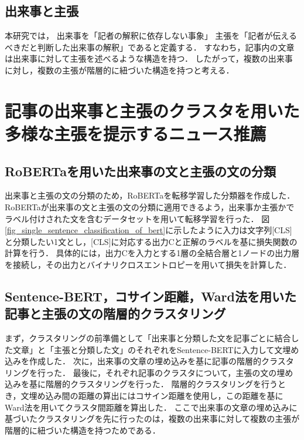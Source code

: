 \documentclass[12pt,a4j,dvipdfmx]{jreport}
\begin{document}
\subsection{出来事と主張}
本研究では，
出来事を「記者の解釈に依存しない事象」
主張を「記者が伝えるべきだと判断した出来事の解釈」であると定義する．
すなわち，記事内の文章は出来事に対して主張を述べるような構造を持つ．
したがって，複数の出来事に対し，複数の主張が階層的に紐づいた構造を持つと考える．


\section{記事の出来事と主張のクラスタを用いた多様な主張を提示するニュース推薦}
\label{section_method_detail}



\subsection{RoBERTaを用いた出来事の文と主張の文の分類}
\label{subsection_classify_method}
出来事と主張の文の分類のため，RoBERTaを転移学習した分類器を作成した．
RoBERTaが出来事の文と主張の文の分類に適用できるよう，出来事か主張かでラベル付けされた文を含むデータセットを用いて転移学習を行った．
図\ref{fig_single_sentence_classification_of_bert}に示したように入力は文字列[CLS]と分類したい1文とし，[CLS]に対応する出力Cと正解のラベルを基に損失関数の計算を行う．
具体的には，出力Cを入力とする1層の全結合層と1ノードの出力層を接続し，その出力とバイナリクロスエントロピーを用いて損失を計算した．

\subsection{Sentence-BERT，コサイン距離，Ward法を用いた記事と主張の文の階層的クラスタリング}

まず，クラスタリングの前準備として「出来事と分類した文を記事ごとに結合した文章」と「主張と分類した文」のそれぞれをSentence-BERTに入力して文埋め込みを作成した．
次に，出来事の文章の埋め込みを基に記事の階層的クラスタリングを行った．
最後に，それぞれ記事のクラスタについて，主張の文の埋め込みを基に階層的クラスタリングを行った．
階層的クラスタリングを行うとき，文埋め込み間の距離の算出にはコサイン距離を使用し，この距離を基にWard法を用いてクラスタ間距離を算出した．
ここで出来事の文章の埋め込みに基づいたクラスタリングを先に行ったのは，複数の出来事に対して複数の主張が階層的に紐づいた構造を持つためである．
\end{document}

